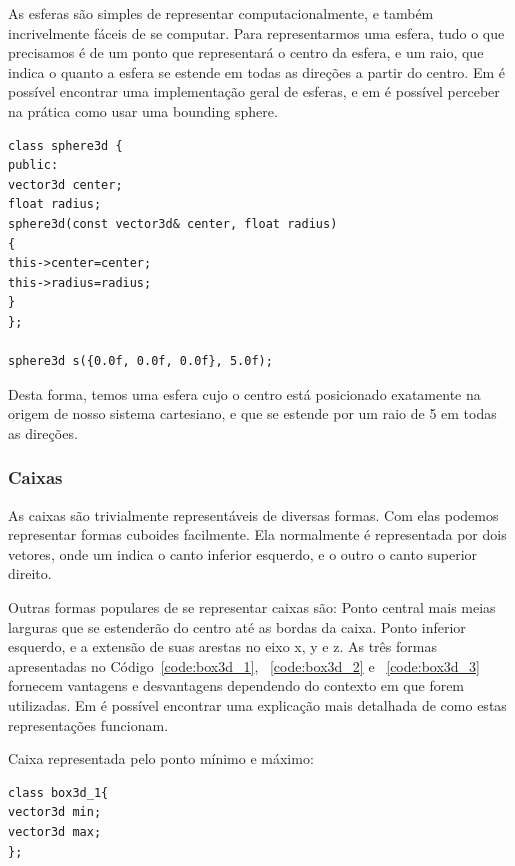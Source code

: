 As esferas são simples de representar computacionalmente, e também
incrivelmente fáceis de se computar. Para representarmos uma esfera, tudo o que
precisamos é de um ponto que representará o centro da esfera, e um raio, que
indica o quanto a esfera se estende em todas as direções a partir do centro.
Em  é possível encontrar uma implementação geral de esferas, e em  é possível perceber na prática como usar uma bounding sphere.

\begin{lstlisting}[frame=single,caption=Representação de esfera\label{code:sphere3d}]
class sphere3d {
public:
vector3d center;
float radius;
sphere3d(const vector3d& center, float radius)
{
this->center=center;
this->radius=radius;
}
};

sphere3d s({0.0f, 0.0f, 0.0f}, 5.0f);
\end{lstlisting}

Desta forma, temos uma esfera cujo o centro está posicionado exatamente na origem de
nosso sistema cartesiano, e que se estende por um raio de 5 em todas as
direções.

\subsubsection{Caixas}

As caixas são trivialmente representáveis de diversas formas. Com elas podemos
representar formas cuboides facilmente. Ela normalmente é representada por dois
vetores, onde um indica o canto inferior esquerdo, e o outro o canto superior direito.

Outras formas populares de se representar caixas são:
Ponto central mais meias larguras que se estenderão do centro até as bordas da caixa.
Ponto inferior esquerdo, e a extensão de suas arestas no eixo x, y e z.
As três formas apresentadas no Código~\ref{code:box3d_1}, ~\ref{code:box3d_2} e ~\ref{code:box3d_3} fornecem vantagens e
desvantagens dependendo do contexto em que forem utilizadas.
Em  é possível encontrar uma explicação mais detalhada de como estas representações funcionam.

Caixa representada pelo ponto mínimo e máximo:

\begin{lstlisting}[frame=single,caption=Representação de caixa ponto mínimo e máximo\label{code:box3d_1}]
class box3d_1{
vector3d min;
vector3d max;
};
\end{lstlisting}


